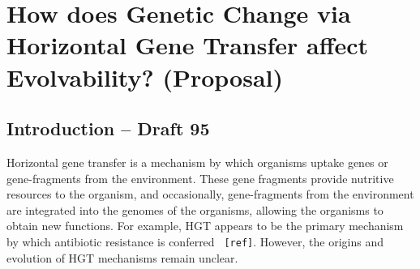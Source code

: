 \section{How does Genetic Change via Horizontal Gene Transfer affect Evolvability? (Proposal)}
\subsection{Introduction – Draft 95}

Horizontal gene transfer is a mechanism by which organisms uptake genes or gene-fragments from the environment.  These gene fragments provide nutritive resources to the organism, and occasionally, gene-fragments from the environment are integrated into the genomes of the organisms, allowing the organisms to obtain new functions. For example, HGT appears to be the primary mechanism by which antibiotic resistance is conferred \verb| [ref]|. However, the origins and evolution of HGT mechanisms remain unclear. 